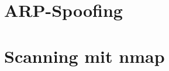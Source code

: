 \documentclass[12pt]{article}
\theoremstyle{plain}
\begin{document}
\subsection{}
\subsection{}
\subsection{}
\subsection{}
\subsection{}
\section{ARP-Spoofing}
\subsection{}
\subsection{}
\subsection{}
\subsection{}
\subsection{}
\subsection{}
\subsection{}
\section{Scanning mit nmap}
\subsection{}
\end{document}
